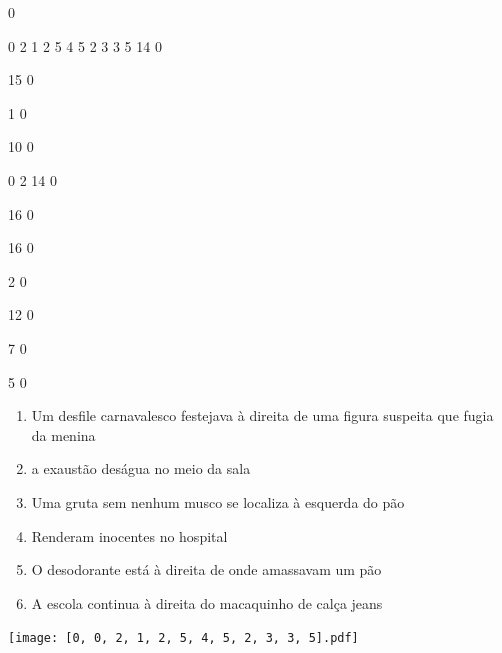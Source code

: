 \documentclass[12pt]{article}
\begin{document}
		\vfill  
		  
{
	0	%

	0	%
	2	%
	1	%
	2	%
	5	%
	4	%
	5	%
	2	%
	3	%
	3	%
	5	%
	14	%
	0	%

	15	%
	0	%

	1	%
	0	%

	10	%
	0	%

	0	%
	2	%
	14	%
	0	%

	16	%
	0	%

	16	%
	0	%

	2	%
	0	%

	12	%
	0	%

	7	%
	0	%

	5	%
	0	%

}	  
		    	

		 

\pagebreak


	\begin{enumerate}
		  \sffamily %
		  \large %


\vfill \item
Um desfile carnavalesco festejava	%
à direita
de uma figura suspeita que fugia da menina	%

\vfill \item
a exaustão deságua	%
no meio da sala	%

\vfill \item
Uma gruta sem nenhum musco se localiza	%
à esquerda
do pão	%

\vfill \item
Renderam inocentes	%
no hospital	%

\vfill \item
O desodorante está	%
à direita
de onde amassavam um pão	%

\vfill \item
A escola continua	%
à direita
do macaquinho de calça jeans	%
	\end{enumerate}
		  
		  \hfill

		  \vfill

\texttt{[image: [0, 0, 2, 1, 2, 5, 4, 5, 2, 3, 3, 5].pdf]}
\end{document}
